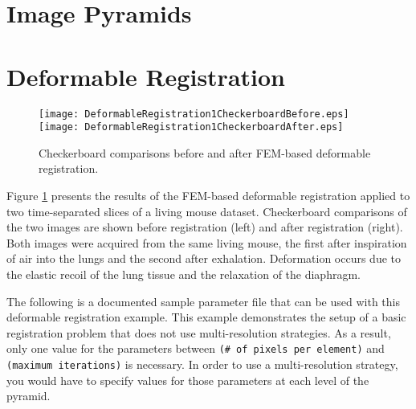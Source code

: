 \section{Image Pyramids}
\label{sec:ImagePyramids}



\section{Deformable Registration}
\label{sec:DeformableRegistration}


 
\begin{figure} \center
\texttt{[image: DeformableRegistration1CheckerboardBefore.eps]}
\texttt{[image: DeformableRegistration1CheckerboardAfter.eps]}
\caption{Checkerboard comparisons before and after FEM-based deformable registration.}
\label{fig:DeformableRegistration1Output}
\end{figure}

Figure \ref{fig:DeformableRegistration1Output} presents the results of
the FEM-based deformable registration applied to two time-separated
slices of a living mouse dataset.  Checkerboard comparisons of the two
images are shown before registration (left) and after registration
(right).  Both images were acquired from the same living mouse, the
first after inspiration of air into the lungs and the second after
exhalation.  Deformation occurs due to the elastic recoil of the lung
tissue and the relaxation of the diaphragm.

The following is a documented sample parameter file that can be used with this
deformable registration example.  This example demonstrates the setup of a
basic registration problem that does not use multi-resolution strategies.  As a
result, only one value for the parameters between \texttt{(\# of pixels per
element)} and \texttt{(maximum iterations)} is necessary.  In order to use a
multi-resolution strategy, you would have to specify values for those
parameters at each level of the pyramid.



